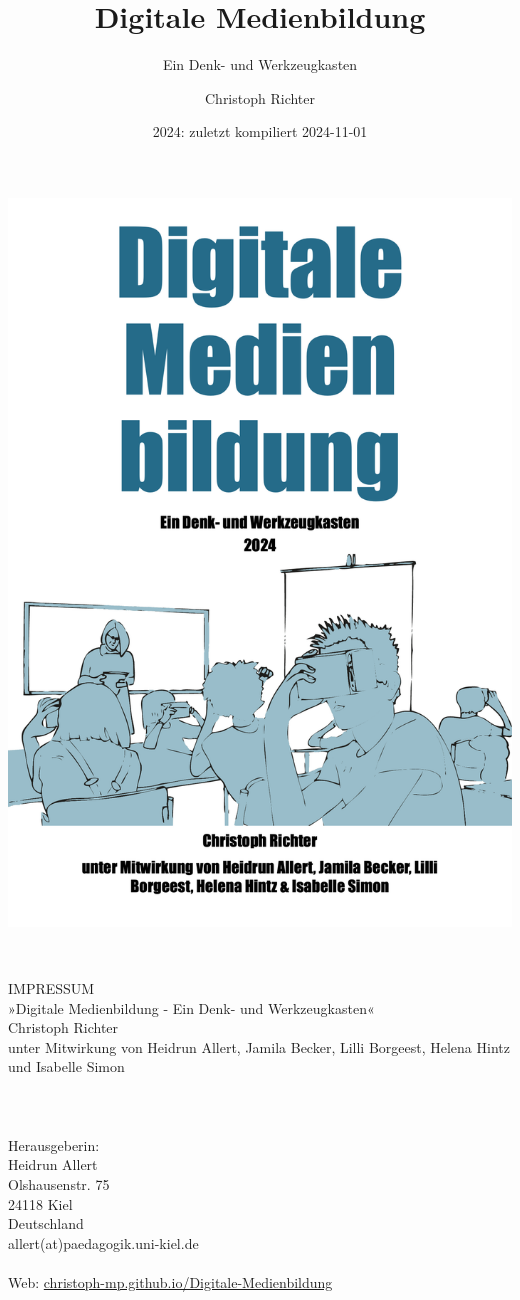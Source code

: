 \documentclass[
  a4paper,
]{book}
\title{Digitale Medienbildung}
\subtitle{Ein Denk- und Werkzeugkasten}
\author{Christoph Richter}
\date{2024: zuletzt kompiliert 2024-11-01}
\begin{document}
\maketitle


\includegraphics[width=\textwidth, height=0.99\textheight]{Figures/Cover.png}


\newpage
~\vfill
\thispagestyle{empty}

\noindent IMPRESSUM\\
\noindent »Digitale Medienbildung - Ein Denk- und Werkzeugkasten«\\
\noindent Christoph Richter\\
\noindent unter Mitwirkung von Heidrun Allert, Jamila Becker, Lilli Borgeest, Helena Hintz und Isabelle Simon\\
\\
\\
\\
\noindent Herausgeberin:\\
Heidrun Allert\\
Olshausenstr. 75\\
24118 Kiel\\
Deutschland\\
allert(at)paedagogik.uni-kiel.de\\
\\
\noindent Web: \href{https://christoph-mp.github.io/Digitale-Medienbildung/}{christoph-mp.github.io/Digitale-Medienbildung}\\ %
\end{document}
